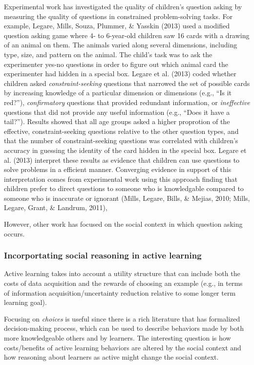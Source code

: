 \documentclass[a4paper,man,apacite,floatsintext]{apa6}
\begin{document}
Experimental work has investigated the quality of children's question
asking by measuring the quality of questions in constrained
problem-solving tasks. For example, Legare, Mills, Souza, Plummer, \&
Yasskin (2013) used a modified question asking game where 4- to
6-year-old children saw 16 cards with a drawing of an animal on them.
The animals varied along several dimensions, including type, size, and
pattern on the animal. The child's task was to ask the experimenter
yes-no questions in order to figure out which animal card the
experimenter had hidden in a special box. Legare et al. (2013) coded
whether children asked \emph{constraint-seeking} questions that narrowed
the set of possible cards by increasing knowledge of a particular
dimension or dimensions (e.g., ``Is it red?''), \emph{confirmatory}
questions that provided redundant information, or \emph{ineffective}
questions that did not provide any useful information (e.g., ``Does it
have a tail?''). Results showed that all age groups asked a higher
proprotion of the effective, constraint-seeking questions relative to
the other question types, and that the number of constraint-seeking
questions was correlated with children's accuracy in guessing the
identity of the card hidden in the special box. Legare et al. (2013)
interpret these results as evidence that children can use questions to
solve problems in a efficient manner. Converging evidence in support of
this interpretation comes from experimental work using this approach
finding that children prefer to direct questions to someone who is
knowledgable compared to someone who is inaccurate or ignorant (Mills,
Legare, Bills, \& Mejias, 2010; Mills, Legare, Grant, \& Landrum, 2011),

However, other work has focused on the social context in which question
asking occurs.

\subsubsection{Incorportating social reasoning in active
learning}\label{incorportating-social-reasoning-in-active-learning}

Active learning takes into account a utility structure that can include
both the costs of data acquisition and the rewards of choosing an
example (e.g., in terms of information acquisition/uncertainty reduction
relative to some longer term learning goal).

Focusing on \emph{choices} is useful since there is a rich literature
that has formalized decision-making process, which can be used to
describe behaviors made by both more knowledgeable others and by
learners. The interesting question is how costs/benefits of active
learning behaviors are altered by the social context and how reasoning
about learners as active might change the social context.
\end{document}
